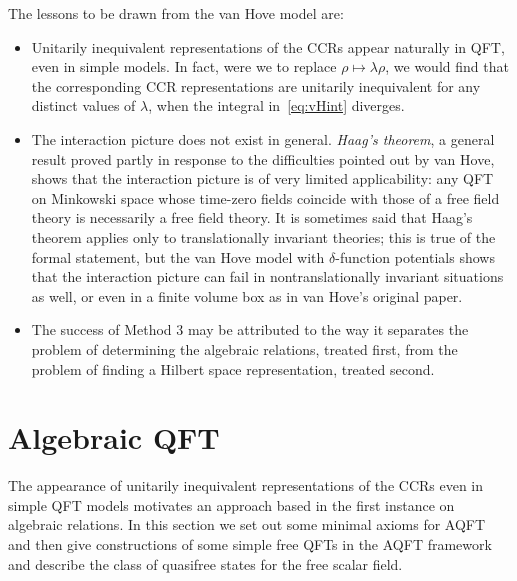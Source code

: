 \documentclass[12pt,a4paper]{article}
\newcommand{\1}{\mathds{1}}                         %
\begin{document}
	The lessons to be drawn from the van Hove model are:
	\begin{itemize}
		\item Unitarily inequivalent representations of the CCRs appear naturally in QFT, even in simple models. In fact, were we to replace $\rho\mapsto  \lambda\rho$, we would find that the corresponding CCR representations are unitarily inequivalent for any distinct values of $\lambda$, when the integral in~\eqref{eq:vHint} diverges.
		\item The interaction picture does not exist in general.  \emph{Haag's theorem}, a general result proved partly in response to the difficulties pointed out by van Hove, shows that the interaction picture is of very limited applicability: any QFT on Minkowski space whose time-zero fields coincide with those of a free field theory is necessarily a free field theory. It is sometimes said that Haag's theorem applies only to translationally invariant theories; this is true of the formal statement, but the van Hove model with $\delta$-function potentials shows that the interaction picture can fail in nontranslationally invariant situations as well, or even in a finite volume box as in van Hove's original paper.
		\item The success of Method 3 may be attributed to the way it separates the problem of determining the algebraic relations, treated first, from the problem of finding a Hilbert space representation, treated second. 
	\end{itemize} 
	
	
	\section{Algebraic QFT}\label{sec:AQFT}
	The appearance of unitarily inequivalent representations of the CCRs even in simple QFT models motivates an approach based in the first instance on algebraic relations. In this section we set out some minimal axioms for AQFT and then give constructions of some simple free QFTs in the AQFT framework and describe the class of quasifree states for the free scalar field. 
\end{document}

